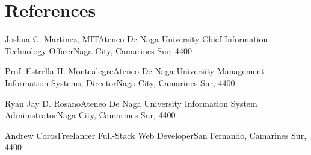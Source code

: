 \section{References}
    \resumeSubHeadingListStart
        \resumeSubheading
        {Joshua C. Martinez, MIT}{Ateneo De Naga University}
        {Chief Information Technology Officer}{Naga City, Camarines Sur, 4400}
        \resumeItemListStart
        \resumeItemListEnd
        
        \resumeSubheading
        {Prof. Estrella H. Montealegre}{Ateneo De Naga University}
        {Management Information Systems, Director}{Naga City, Camarines Sur, 4400}
        \resumeItemListStart
        \resumeItemListEnd

        \resumeSubheading
        {Ryan Jay D. Rosano}{Ateneo De Naga University}
        {Information System Administrator}{Naga City, Camarines Sur, 4400}
        \resumeItemListStart
        \resumeItemListEnd
        
        \resumeSubheading
        {Andrew Coros}{Freelancer}
        {Full-Stack Web Developer}{San Fernando, Camarines Sur, 4400}
        \resumeItemListStart
        \resumeItemListEnd
    
    \resumeSubHeadingListEnd